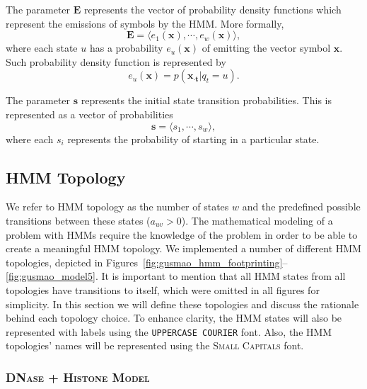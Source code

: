 The parameter $\mathbf{E}$ represents the vector of probability density functions which represent the emissions of symbols by the HMM. More formally,
\begin{equation}
  \label{eq:hmm.e}
  \mathbf{E} = \langle e_1(\mathbf{x}), \cdots, e_{w}(\mathbf{x}) \rangle,
\end{equation}
where each state $u$ has a probability $e_u(\mathbf{x})$ of emitting the vector symbol $ \mathbf{x} $. Such probability density function is represented by
\begin{equation}
  \label{eq:hmm.emission}
  e_u(\mathbf{x}) = p( \mathbf{{x}_{\cdot t}} | q_t = u).
\end{equation}

The parameter $\mathbf{s}$ represents the initial state transition probabilities. This is represented as a vector of probabilities
\begin{equation}
  \label{eq:hmm.initial}
  \mathbf{s} = \langle s_{1}, \cdots, s_{w} \rangle,
\end{equation}
where each $s_i$ represents the probability of starting in a particular state.

\subsection{HMM Topology}
\label{sec:hmm.topology}

We refer to HMM topology as the number of states $w$ and the predefined possible transitions between these states ($a_{uv} > 0$). The mathematical modeling of a problem with HMMs require the knowledge of the problem in order to be able to create a meaningful HMM topology. We implemented a number of different HMM topologies, depicted in Figures~\ref{fig:gusmao_hmm_footprinting}--\ref{fig:gusmao_model5}. It is important to mention that all HMM states from all topologies have transitions to itself, which were omitted in all figures for simplicity. In this section we will define these topologies and discuss the rationale behind each topology choice. To enhance clarity, the HMM states will also be represented with labels using the {\tt UPPERCASE COURIER} font. Also, the HMM topologies' names will be represented using the \textsc{Small Capitals} font.

\subsubsection{\textsc{DNase + Histone Model}}

